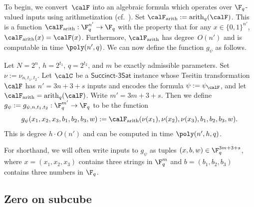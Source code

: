 \documentclass[11pt]{article}
\newcommand{\arith}[2]{\mathrm{arith}_{#1}(#2)}
\newcommand{\succinct}{\mathsf{Succinct}\text{-}\mathsf{3Sat}}
\begin{document}
To begin, we convert~$\calF$ into an algebraic formula which operates over $\F_q$-valued inputs using arithmetization (cf.\ ).
Set $\calF_{\mathrm{arith}} := \arith{q}{\calF}$.
This is a  function $\calF_{\mathrm{arith}}:\F_q^{n'}\rightarrow \F_q$
with the property that for any $x \in \{0, 1\}^{n'}$, $\calF_{\mathrm{arith}}(x) = \calF(x)$.
Furthermore, $\calF_{\mathrm{arith}}$ has degree~$O(n')$ and is computable in time $\poly(n', q)$.
We can now define the function $g_\psi$ as follows.
\begin{definition}\label{def:encoded-function}
Let $N=2^n$, $h = 2^{t_1}$, $q= 2^{t_2}$, and $m$ be exactly admissible parameters.
Set $\nu:=\nu_{n, t_1, t_2}$.
Let $\calC$ be a $\succinct$ instance whose Tseitin transformation~$\calF$
has $n' = 3n + 3 + s$ inputs and encodes the formula $\psi := \psi_{\calF}$,
and let $\calF_{\mathrm{arith}} = \arith{q}{\calF}$.
Write $m' = 3m + 3 + s$.
Then we define $g_\psi := g_{\psi, n, t_1, t_2} : \F_q^{m'} \rightarrow \F_q$ to be the function
\begin{equation*}
g_\psi(x_1, x_2, x_3, b_1, b_2, b_3, w) := \calF_{\mathrm{arith}}(\nu(x_1), \nu(x_2), \nu(x_3), b_1, b_2, b_3, w).
\end{equation*}
This is degree $h \cdot O(n')$ and can be computed in time $\poly(n',h,q)$.
\end{definition}
For shorthand, we will often write inputs to $g_\psi$ as tuples $(x, b, w) \in \F_q^{3m+3+s}$, where $x = (x_1, x_2, x_3)$ contains three strings in $\F_q^m$
and $b = (b_1, b_2, b_3)$ contains three numbers in $\F_q$.

\subsection{Zero on subcube}
\end{document}
